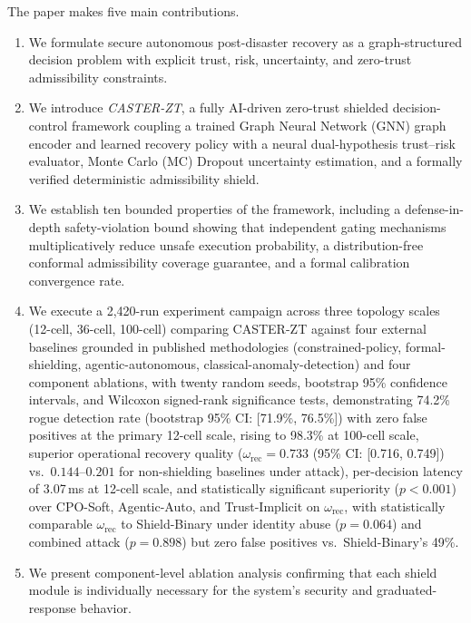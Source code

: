 \documentclass[10pt,journal,compsoc]{IEEEtran}
\begin{document}
The paper makes five main contributions.
\begin{enumerate}
    \item We formulate secure autonomous post-disaster recovery as a graph-structured decision problem with explicit trust, risk, uncertainty, and zero-trust admissibility constraints.
    \item We introduce \emph{CASTER-ZT}, a fully AI-driven zero-trust shielded decision-control framework coupling a trained Graph Neural Network (GNN) graph encoder and learned recovery policy with a neural dual-hypothesis trust--risk evaluator, Monte Carlo (MC) Dropout uncertainty estimation, and a formally verified deterministic admissibility shield.
    \item We establish ten bounded properties of the framework, including a defense-in-depth safety-violation bound showing that independent gating mechanisms multiplicatively reduce unsafe execution probability, a distribution-free conformal admissibility coverage guarantee, and a formal calibration convergence rate.
    \item We execute a 2,420-run experiment campaign across three topology scales (12-cell, 36-cell, 100-cell) comparing CASTER-ZT against four external baselines grounded in published methodologies (constrained-policy, formal-shielding, agentic-autonomous, classical-anomaly-detection) and four component ablations, with twenty random seeds, bootstrap 95\% confidence intervals, and Wilcoxon signed-rank significance tests, demonstrating 74.2\% rogue detection rate (bootstrap 95\% CI: [71.9\%, 76.5\%]) with zero false positives at the primary 12-cell scale, rising to 98.3\% at 100-cell scale, superior operational recovery quality ($\omega_{\mathrm{rec}} = 0.733$ (95\% CI: [0.716, 0.749]) vs.\ $0.144$--$0.201$ for non-shielding baselines under attack), per-decision latency of 3.07\,ms at 12-cell scale, and statistically significant superiority ($p<0.001$) over CPO-Soft, Agentic-Auto, and Trust-Implicit on $\omega_{\mathrm{rec}}$, with statistically comparable $\omega_{\mathrm{rec}}$ to Shield-Binary under identity abuse ($p = 0.064$) and combined attack ($p = 0.898$) but zero false positives vs.\ Shield-Binary's 49\%.
    \item We present component-level ablation analysis confirming that each shield module is individually necessary for the system's security and graduated-response behavior.
\end{enumerate}
\end{document}
